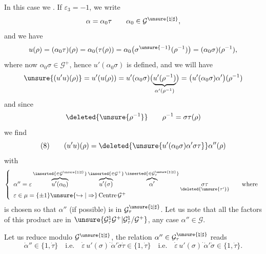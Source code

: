 In this case we . If $\varepsilon_3=-1$, we write
\[
\alpha=\alpha_0\tau\qquad
\alpha_0\in\mathcal{G}^{\unsure{\natural|\sharp}},
\]
and we have
\[
u(\rho)=(\alpha_0\tau)(\rho)=\alpha_0(\tau(\rho))
=\alpha_0\bigl(\sigma^{\unsure{-1}}(\rho^{-1})\bigr)
=(\alpha_0\sigma)(\rho^{-1}),
\]
where now $\alpha_0\sigma\in\mathcal{G}^{+}$, hence
$u'(\alpha_0\sigma)$ is defined, and we will have
\[
\unsure{(u'u)(\rho)}
=u'(u(\rho))
=u'(\alpha_0\sigma)
\bigl(\underbrace{u'(\rho^{-1})}_{\alpha'(\rho^{-1})}\bigr)
=\bigl(u'(\alpha_0\sigma)\alpha'\bigr)(\rho^{-1})
\]
and since
\[
\deleted{\unsure{\rho^{-1}}}\qquad
\rho^{-1}=\sigma\tau(\rho)
\]
we find
\[
(8)\qquad
(u'u)(\rho)=
\deleted{\unsure{u'(\alpha_0\sigma)\alpha'\sigma\tau}}
\alpha''(\rho)
\]
with
\[
\left\{
\begin{array}{l}
\alpha''=\varepsilon
\overbrace{u'(\alpha_0)}^{\inserted{\in\mathcal{G}^{\unsure{\natural|\sharp}}}}
\overbrace{u'(\sigma)}^{\inserted{\in\mathcal{G}^{+}}}
\overbrace{\alpha'}^{\inserted{\in\mathcal{G}^{\unsure{\natural|\sharp}}_\tau}}
\underset{\deleted{\unsure{\tau'}}}{\sigma\tau}
\qquad\text{where}\\
\varepsilon\in\mu=\{\pm1\}
\unsure{\hookrightarrow|\Rightarrow}\operatorname{Centre}\mathcal{G}^{+}
\end{array}
\right.
\]
 is chosen so that $\alpha''$ (if possible)
is in $\mathcal{G}^{\unsure{\natural|\sharp}}_\tau$.
Let us note that all the factors of this product are in
$\unsure{\mathcal{G}^{\natural}_\tau\mathcal{G}^{+}|
\mathcal{G}^{\natural}_\tau/\mathcal{G}^{+}}$,
 any case $\alpha''\in\mathcal{G}$.



Let us reduce modulo $\mathcal{G}^{\unsure{\natural|\sharp}}$,
the relation $\alpha''\in\mathcal{G}^{\unsure{\natural|\sharp}}_\tau$
reads
\[
\dot{\alpha}''\in\{1,\dot{\tau}\}\quad\text{i.e.}\quad
\dot{\varepsilon}\,u'(\sigma)^{\cdot}\dot{\alpha}'\dot{\sigma}\dot{\tau}
\in\{1,\dot{\tau}\}
\quad\text{i.e.}\quad
\dot{\varepsilon}\,u'(\sigma)^{\cdot}\dot{\alpha}'\dot{\sigma}
\in\{1,\dot{\tau}\}.
\]

